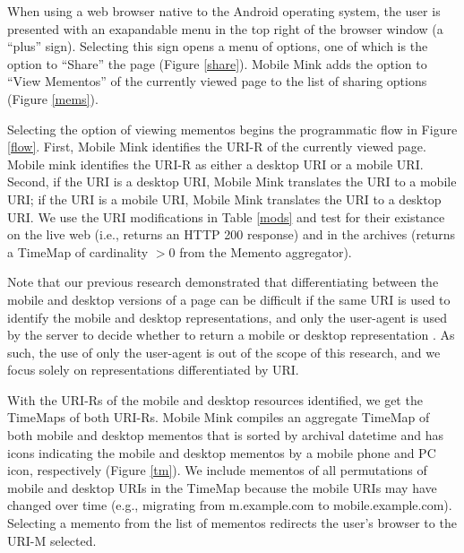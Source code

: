\documentclass{sig-alternate}
\begin{document}
When using a web browser native to the Android operating system, the user is presented with an exapandable menu in the top right of the browser window (a ``plus'' sign). Selecting this sign opens a menu of options, one of which is the option to ``Share'' the page (Figure \ref{share}). Mobile Mink adds the option to ``View Mementos'' of the currently viewed page to the list of sharing options (Figure \ref{mems}).

Selecting the option of viewing mementos begins the programmatic flow in Figure \ref{flow}. First, Mobile Mink identifies the URI-R of the currently viewed page. Mobile mink identifies the URI-R as either a desktop URI or a mobile URI. Second, if the URI is a desktop URI, Mobile Mink translates the URI to a mobile URI; if the URI is a mobile URI, Mobile Mink translates the URI to a desktop URI. We use the URI modifications in Table \ref{mods} and test for their existance on the live web (i.e., returns an HTTP 200 response) and in the archives (returns a TimeMap of cardinality $\gt 0$ from the Memento aggregator).

Note that our previous research demonstrated that differentiating between the mobile and desktop versions of a page can be difficult if the same URI is used to identify the mobile and desktop representations, and only the user-agent is used by the server to decide whether to return a mobile or desktop representation \cite{idReps}. As such, the use of only the user-agent is out of the scope of this research, and we focus solely on representations differentiated by URI.

With the URI-Rs of the mobile and desktop resources identified, we get the TimeMaps of both URI-Rs. Mobile Mink compiles an aggregate TimeMap of both mobile and desktop mementos that is sorted by archival datetime and has icons indicating the mobile and desktop mementos by a mobile phone and PC icon, respectively (Figure \ref{tm}). We include mementos of all permutations of mobile and desktop URIs in the TimeMap because the mobile URIs may have changed over time (e.g., migrating from m.example.com to mobile.example.com). Selecting a memento from the list of mementos redirects the user's browser to the URI-M selected.
\end{document}
